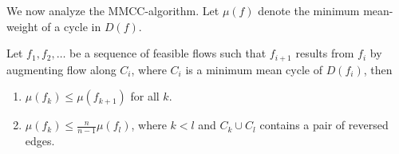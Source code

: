   We now analyze the MMCC-algorithm. Let $\mu(f)$ denote the minimum
  mean-weight of a cycle in $D(f)$. 
  
  \begin{lemma}
    \label{lem:8}
    Let $f_1,f_2,\ldots$ be a sequence of feasible flows such that
    $f_{i+1}$ results from $f_i$ by augmenting flow along $C_i$, where
    $C_i$ is a minimum mean cycle of $D(f_i)$, then
    \begin{enumerate}
    \item \label{item:5} $\mu(f_k)\leq\mu(f_{k+1})$ for all $k$.
    \item \label{item:6} $\mu(f_k) \leq \frac{n}{n-1} \mu(f_l)$, where $k<l$
      and $C_k \cup C_l$ contains a pair of reversed edges.
    \end{enumerate}
  \end{lemma}



